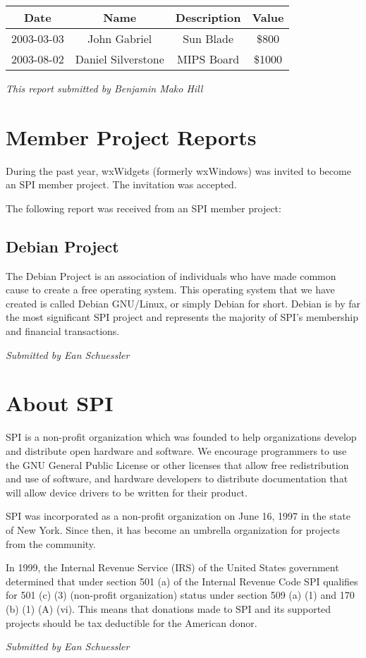 \documentclass[letterpaper]{report}
\begin{document}
\begin{tabular}{|c|c|c|c|}
\hline
Date & Name & Description & Value\tabularnewline
\hline
\hline
2003-03-03 & John Gabriel & Sun Blade & \$800\tabularnewline
\hline
2003-08-02 & Daniel Silverstone & MIPS Board & \$1000\tabularnewline
\hline
\end{tabular}

\emph{This report submitted by Benjamin Mako Hill}


\chapter{Member Project Reports}

During the past year, wxWidgets (formerly wxWindows) was invited to
become an SPI member project. The invitation was accepted.

The following report was received from an SPI member project:


\section{Debian Project}

The Debian Project is an association of individuals who have made
common cause to create a free operating system. This operating system
that we have created is called Debian GNU/Linux, or simply Debian
for short. Debian is by far the most significant SPI project and represents
the majority of SPI's membership and financial transactions.

\emph{Submitted by Ean Schuessler}

\appendix

\chapter{About SPI}

SPI is a non-profit organization which was founded to help organizations
develop and distribute open hardware and software. We encourage programmers
to use the GNU General Public License or other licenses that allow
free redistribution and use of software, and hardware developers to
distribute documentation that will allow device drivers to be written
for their product.

SPI was incorporated as a non-profit organization on June 16, 1997
in the state of New York. Since then, it has become an umbrella organization
for projects from the community.

In 1999, the Internal Revenue Service (IRS) of the United States government
determined that under section 501 (a) of the Internal Revenue Code
SPI qualifies for 501 (c) (3) (non-profit organization) status under
section 509 (a) (1) and 170 (b) (1) (A) (vi). This means that donations
made to SPI and its supported projects should be tax deductible for
the American donor.

\emph{Submitted by Ean Schuessler}
\end{document}
